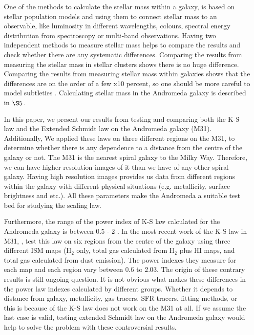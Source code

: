 \documentclass[useAMS,usenatbib]{mn2e}
\begin{document}
One of the methods to calculate the stellar mass within a galaxy, is based on stellar population models \citep[e.g.][]{ Bruzual93, Kotulla09} and using them to connect stellar mass to an observable, like luminosity in different wavelengths, colours, spectral energy distribution from spectroscopy or multi-band observations. Having two independent methods to measure stellar mass helps to compare the results and check whether there are any systematic differences. Comparing the results from measuring the stellar mass in stellar clusters shows there is no huge difference. Comparing the results from measuring stellar mass within galaxies shows that the differences are on the order of a few x10 percent, so one should be more careful to model subtleties \citep{McLaughlin05}. Calculating stellar mass in the Andromeda galaxy is described in $\S5$.

In this paper, we present our results from testing and comparing both the K-S law and the Extended Schmidt law on the Andromeda galaxy (M31). %
Additionally, We applied these laws on three different regions on the M31, to determine whether there is any dependence to a distance from the centre of the galaxy or not. The M31 is the nearest spiral galaxy to the Milky Way. Therefore, we can have higher resolution images of it than we have of any other spiral galaxy. Having high resolution images provides us data from different regions within the galaxy with different physical situations (e.g. metallicity, surface brightness and etc.). All these parameters make the Andromeda a suitable test bed for studying the scaling law.

Furthermore, the range of the power index of K-S law calculated for the Andromeda galaxy is between 0.5 - 2 \citep[e.g.,][]{Tabatabaei10,Ford13}. %
In the most recent work of the K-S law in M31, \cite{Ford13}, test this law on six regions from the centre of the galaxy using three different ISM maps (H$_2$ only, total gas calculated from H$_2$ plus HI maps, and total gas calculated from dust emission). The power indexes they measure for each map and each region vary between 0.6 to 2.03. The origin of these contrary results is still ongoing question. It is not obvious what makes these differences in the power law indexes calculated by different groups. Whether it depends to distance from galaxy, metallicity, gas tracers, SFR tracers, fitting methods, or this is because of the K-S law does not work on the M31 at all. If we assume the last case is valid, testing extended Schmidt law on the Andromeda galaxy would help to solve the problem with these controversial results.
\end{document}
